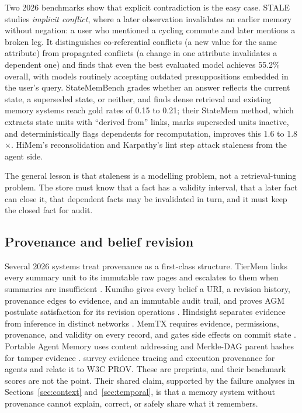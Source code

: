 \documentclass[11pt]{article}
\begin{document}
Two 2026 benchmarks show that explicit contradiction is the easy case. STALE \citep{chao2026stale} studies \emph{implicit conflict}, where a later observation invalidates an earlier memory without negation: a user who mentioned a cycling commute and later mentions a broken leg. It distinguishes co-referential conflicts (a new value for the same attribute) from propagated conflicts (a change in one attribute invalidates a dependent one) and finds that even the best evaluated model achieves 55.2\% overall, with models routinely accepting outdated presuppositions embedded in the user's query. StateMemBench \citep{fan2026statemem} grades whether an answer reflects the current state, a superseded state, or neither, and finds dense retrieval and existing memory systems reach gold rates of 0.15 to 0.21; their StateMem method, which extracts state units with ``derived from'' links, marks superseded units inactive, and deterministically flags dependents for recomputation, improves this 1.6 to 1.8$\times$. HiMem's reconsolidation and Karpathy's lint step attack staleness from the agent side.

The general lesson is that staleness is a modelling problem, not a retrieval-tuning problem. The store must know that a fact has a validity interval, that a later fact can close it, that dependent facts may be invalidated in turn, and it must keep the closed fact for audit.

\subsection{Provenance and belief revision}

Several 2026 systems treat provenance as a first-class structure. TierMem links every summary unit to its immutable raw pages and escalates to them when summaries are insufficient \citep{zhu2026tiermem}. Kumiho gives every belief a URI, a revision history, provenance edges to evidence, and an immutable audit trail, and proves AGM postulate satisfaction for its revision operations \citep{park2026kumiho}. Hindsight separates evidence from inference in distinct networks \citep{latimer2025hindsight}. MemTX requires evidence, permissions, provenance, and validity on every record, and gates side effects on commit state \citep{li2026memtx}. Portable Agent Memory uses content addressing and Merkle-DAG parent hashes for tamper evidence \citep{ravindran2026portable}. \citet{wang2026traces} survey evidence tracing and execution provenance for agents and relate it to W3C PROV. These are preprints, and their benchmark scores are not the point. Their shared claim, supported by the failure analyses in Sections~\ref{sec:context} and~\ref{sec:temporal}, is that a memory system without provenance cannot explain, correct, or safely share what it remembers.
\end{document}
